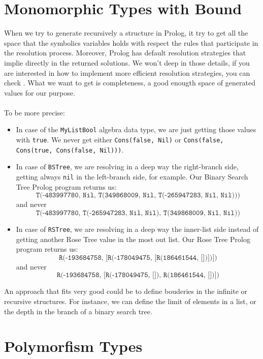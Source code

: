 \documentclass{report}
\theoremstyle{definition}
\theoremstyle{definition}
\newcommand{\ttt}[1]{\texttt{#1}}
\begin{document}
\section{Monomorphic Types with Bound}

When we try to generate recursively a structure in Prolog, it try to get all the space that the symbolics variables holds with respect the rules that participate in the resolution process. Moreover, Prolog has default resolution strategies that implie directly in the returned solutions. We won't deep in those details, if you are interested in how to implement more efficient resolution strategies, you can check \cite{effgenttransf}. What we want to get is completeness, a good enougth space of generated values for our purpose.\\\\
To be more precise:
\begin{itemize}
	\item In case of the \ttt{MyListBool} algebra data type, we are just getting those values with \ttt{true}. We never get either \ttt{Cons(false, Nil)} or \ttt{Cons(false, Cons(true, Cons(false, Nil)))}.
	\item In case of \ttt{BSTree}, we are resolving in a deep way the right-branch side, getting always \ttt{nil} in the left-branch side, for example. Our Binary Search Tree Prolog program returns us: $$\ttt{T(-483997780, Nil, T(349868009, Nil, T(-265947283, Nil, Nil)))}$$ and never $$\ttt{T(-483997780, T(-265947283, Nil, Nil), T(349868009, Nil, Nil))}$$
	\item In case of \ttt{RSTree}, we are resolving in a deep way the inner-list side instead of getting another Rose Tree value in the most out list. Our Rose Tree Prolog program returns us: $$\ttt{R(-193684758, [R(-178049475, [R(186461544, [])])])}$$ and never $$\ttt{R(-193684758, [R(-178049475, []), R(186461544, [])])}$$
\end{itemize}
An approach that fits very good could be to define bouderies in the infinite or recursive structures. For instance, we can define the limit of elements in a list, or the depth in the branch of a binary search tree.
\section{Polymorfism Types}
\end{document}
